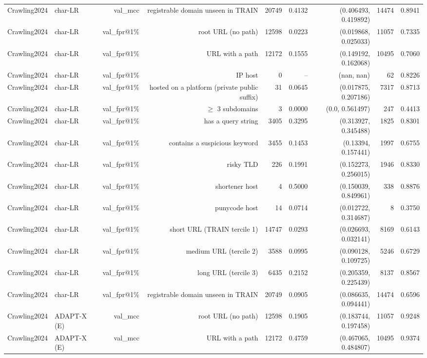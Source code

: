 \begin{table}[t]
\begin{tabular}{llrrrrrrr}
Crawling2024 & char-LR & val\_mcc & registrable domain unseen in TRAIN & 20749 & 0.4132 & (0.406493, 0.419892) & 14474 & 0.8941 \\
Crawling2024 & char-LR & val\_fpr@1\% & root URL (no path) & 12598 & 0.0223 & (0.019868, 0.025033) & 11057 & 0.7335 \\
Crawling2024 & char-LR & val\_fpr@1\% & URL with a path & 12172 & 0.1555 & (0.149192, 0.162068) & 10495 & 0.7060 \\
Crawling2024 & char-LR & val\_fpr@1\% & IP host & 0 & -- & (nan, nan) & 62 & 0.8226 \\
Crawling2024 & char-LR & val\_fpr@1\% & hosted on a platform (private public suffix) & 31 & 0.0645 & (0.017875, 0.207186) & 7317 & 0.8713 \\
Crawling2024 & char-LR & val\_fpr@1\% & $\geq$ 3 subdomains & 3 & 0.0000 & (0.0, 0.561497) & 247 & 0.4413 \\
Crawling2024 & char-LR & val\_fpr@1\% & has a query string & 3405 & 0.3295 & (0.313927, 0.345488) & 1825 & 0.8301 \\
Crawling2024 & char-LR & val\_fpr@1\% & contains a suspicious keyword & 3455 & 0.1453 & (0.13394, 0.157441) & 1997 & 0.6755 \\
Crawling2024 & char-LR & val\_fpr@1\% & risky TLD & 226 & 0.1991 & (0.152273, 0.256015) & 1946 & 0.8330 \\
Crawling2024 & char-LR & val\_fpr@1\% & shortener host & 4 & 0.5000 & (0.150039, 0.849961) & 338 & 0.8876 \\
Crawling2024 & char-LR & val\_fpr@1\% & punycode host & 14 & 0.0714 & (0.012722, 0.314687) & 8 & 0.3750 \\
Crawling2024 & char-LR & val\_fpr@1\% & short URL (TRAIN tercile 1) & 14747 & 0.0293 & (0.026693, 0.032141) & 8169 & 0.6143 \\
Crawling2024 & char-LR & val\_fpr@1\% & medium URL (tercile 2) & 3588 & 0.0995 & (0.090128, 0.109725) & 5246 & 0.6729 \\
Crawling2024 & char-LR & val\_fpr@1\% & long URL (tercile 3) & 6435 & 0.2152 & (0.205359, 0.225439) & 8137 & 0.8567 \\
Crawling2024 & char-LR & val\_fpr@1\% & registrable domain unseen in TRAIN & 20749 & 0.0905 & (0.086635, 0.094441) & 14474 & 0.6596 \\
Crawling2024 & ADAPT-X (E) & val\_mcc & root URL (no path) & 12598 & 0.1905 & (0.183744, 0.197458) & 11057 & 0.9248 \\
Crawling2024 & ADAPT-X (E) & val\_mcc & URL with a path & 12172 & 0.4759 & (0.467065, 0.484807) & 10495 & 0.9374 \\

\end{tabular}
\end{table}
